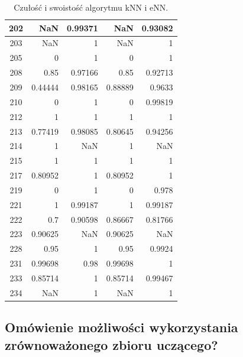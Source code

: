 \begin{table}[H]
\begin{tabular}{|c|r|r|r|r|}
\hline                                   
202 &NaN &0.99371 &NaN &0.93082\\        
\hline                                   
203 &NaN &1 &NaN &1\\                    
\hline                                   
205 &0 &1 &0 &1\\                        
\hline                                   
208 &0.85 &0.97166 &0.85 &0.92713\\      
\hline                                   
209 &0.44444 &0.98165 &0.88889 &0.9633\\ 
\hline                                   
210 &0 &1 &0 &0.99819\\                  
\hline                                   
212 &1 &1 &1 &1\\                        
\hline                                   
213 &0.77419 &0.98085 &0.80645 &0.94256\\
\hline                                   
214 &1 &NaN &1 &NaN\\                    
\hline                                   
215 &1 &1 &1 &1\\                        
\hline                                   
217 &0.80952 &1 &0.80952 &1\\            
\hline                                   
219 &0 &1 &0 &0.978\\                    
\hline                                   
221 &1 &0.99187 &1 &0.99187\\            
\hline                                   
222 &0.7 &0.90598 &0.86667 &0.81766\\    
\hline                                   
223 &0.90625 &NaN &0.90625 &NaN\\        
\hline                                   
228 &0.95 &1 &0.95 &0.9924\\             
\hline                                   
231 &0.99698 &0.98 &0.99698 &1\\         
\hline                                   
233 &0.85714 &1 &0.85714 &0.99467\\      
\hline                                   
234 &NaN &1 &NaN &1\\                    
\hline                                   
	\end{tabular}
	\caption{Czułość i swoistość algorytmu kNN i eNN.}
	\label{tab:matlab-wskazniki}
\end{table}
\subsection{Omówienie możliwości wykorzystania zrównoważonego zbioru uczącego?}

